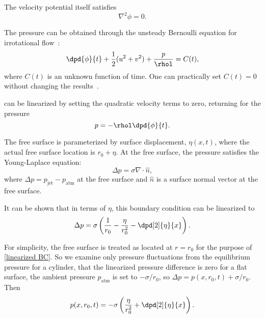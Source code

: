 \documentclass[ccbysa,note,git]{bmtreport}
\begin{document}
The velocity potential itself satisfies~\citep[p.~284]{panton_incompressible_2013}
\begin{equation}
   \nabla^2 \phi = 0. \label{eq:Laplace equation}
\end{equation}

The pressure can be obtained through the unsteady Bernoulli equation for irrotational flow~\citep[p.~284]{panton_incompressible_2013}:
\begin{equation}
   \dpd{\phi}{t} + \frac{1}{2} (u^2 + v^2) + \frac{p}{\rhol} = C(t), \label{eq:unsteady Bernoulli}
\end{equation}
where $C(t)$ is an unknown function of time. One can practically set $C(t) = 0$ without changing the results~\citep[p.~503]{panton_incompressible_2013}.

 can be linearized by setting the quadratic velocity terms to zero, returning for the pressure
\begin{equation}
   p = -\rhol \dpd{\phi}{t}. \label{eq:unsteady Bernoulli linearized}
\end{equation}

The free surface is parameterized by surface displacement, $\eta(x, t)$, where the actual free surface location is $r_0 + \eta$. At the free surface, the pressure satisfies the Young-Laplace equation:
\begin{equation}
   \Delta p = \sigma \nabla \cdot \hat{n}, \label{eq:exact BC}
\end{equation}
where $\Delta p = p_\text{jet} - p_\text{atm}$ at the free surface and $\hat{n}$ is a surface normal vector at the free surface.

It can be shown that in terms of $\eta$, this boundary condition can be linearized to~\citep[p.~975]{berger_initial-value_1988}
\begin{equation}
   \Delta p = \sigma \left(\frac{1}{r_0} - \frac{\eta}{r_0^2} - \dpd[2]{\eta}{x}\right). \label{eq:linearized BC}
\end{equation}

For simplicity, the free surface is treated as located at $r = r_0$ for the purpose of \eqref{linearized BC}. So we examine only pressure fluctuations from the equilibrium pressure for a cylinder, that the linearized pressure difference is zero for a flat surface, the ambient pressure $p_\text{atm}$ is set to $-\sigma/r_0$, so $\Delta p = p(x, r_0, t) + \sigma/r_0$. Then
\begin{equation}
   p(x, r_0, t) = -\sigma \left(\frac{\eta}{r_0^2} + \dpd[2]{\eta}{x}\right). \label{eq:linearized BC simplified}
\end{equation}
\end{document}
